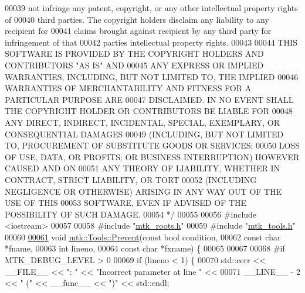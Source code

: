 \begin{DoxyCode}
00039 \textcolor{comment}{not infringe any patent, copyright, or any other intellectual property rights of}
00040 \textcolor{comment}{third parties. The copyright holders disclaim any liability to any recipient for}
00041 \textcolor{comment}{claims brought against recipient by any third party for infringement of that}
00042 \textcolor{comment}{parties intellectual property rights.}
00043 \textcolor{comment}{}
00044 \textcolor{comment}{THIS SOFTWARE IS PROVIDED BY THE COPYRIGHT HOLDERS AND CONTRIBUTORS "AS IS" AND}
00045 \textcolor{comment}{ANY EXPRESS OR IMPLIED WARRANTIES, INCLUDING, BUT NOT LIMITED TO, THE IMPLIED}
00046 \textcolor{comment}{WARRANTIES OF MERCHANTABILITY AND FITNESS FOR A PARTICULAR PURPOSE ARE}
00047 \textcolor{comment}{DISCLAIMED. IN NO EVENT SHALL THE COPYRIGHT HOLDER OR CONTRIBUTORS BE LIABLE FOR}
00048 \textcolor{comment}{ANY DIRECT, INDIRECT, INCIDENTAL, SPECIAL, EXEMPLARY, OR CONSEQUENTIAL DAMAGES}
00049 \textcolor{comment}{(INCLUDING, BUT NOT LIMITED TO, PROCUREMENT OF SUBSTITUTE GOODS OR SERVICES;}
00050 \textcolor{comment}{LOSS OF USE, DATA, OR PROFITS; OR BUSINESS INTERRUPTION) HOWEVER CAUSED AND ON}
00051 \textcolor{comment}{ANY THEORY OF LIABILITY, WHETHER IN CONTRACT, STRICT LIABILITY, OR TORT}
00052 \textcolor{comment}{(INCLUDING NEGLIGENCE OR OTHERWISE) ARISING IN ANY WAY OUT OF THE USE OF THIS}
00053 \textcolor{comment}{SOFTWARE, EVEN IF ADVISED OF THE POSSIBILITY OF SUCH DAMAGE.}
00054 \textcolor{comment}{*/}
00055 
00056 \textcolor{preprocessor}{#include <iostream>}
00057 
00058 \textcolor{preprocessor}{#include "\hyperlink{mtk__roots_8h}{mtk\_roots.h}"}
00059 \textcolor{preprocessor}{#include "\hyperlink{mtk__tools_8h}{mtk\_tools.h}"}
00060 
\hypertarget{mtk__tools_8cc_source_l00061}{}\hyperlink{classmtk_1_1Tools_afe5bb096309258e2e72503fd7b41c7e0}{00061} \textcolor{keywordtype}{void} \hyperlink{classmtk_1_1Tools_afe5bb096309258e2e72503fd7b41c7e0}{mtk::Tools::Prevent}(\textcolor{keyword}{const} \textcolor{keywordtype}{bool} condition,
00062                          \textcolor{keyword}{const} \textcolor{keywordtype}{char} *fname,
00063                          \textcolor{keywordtype}{int} lineno,
00064                          \textcolor{keyword}{const} \textcolor{keywordtype}{char} *fxname) \{
00065 
00067 
00068 \textcolor{preprocessor}{  #if MTK\_DEBUG\_LEVEL > 0}
00069   \textcolor{keywordflow}{if} (lineno < 1) \{
00070     std::cerr << \_\_FILE\_\_ << \textcolor{stringliteral}{": "} << \textcolor{stringliteral}{"Incorrect parameter at line "} <<
00071     \_\_LINE\_\_ - 2 << \textcolor{stringliteral}{" ("} << \_\_func\_\_ << \textcolor{stringliteral}{")"} << std::endl;

\end{DoxyCode}
